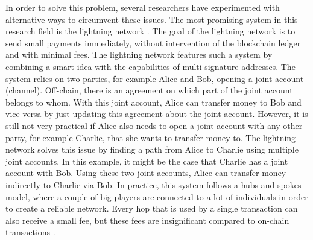 In order to solve this problem, several researchers have experimented with alternative ways to circumvent these issues. The most promising system in this research field is the lightning network \cite{poon2016bitcoin}. The goal of the lightning network is to send small payments immediately, without intervention of the blockchain ledger and with minimal fees. The lightning network features such a system by combining a smart idea with the capabilities of multi signature addresses. The system relies on two parties, for example Alice and Bob, opening a joint account (channel). Off-chain, there is an agreement on which part of the joint account belongs to whom. With this joint account, Alice can transfer money to Bob and vice versa by just updating this agreement about the joint account. However, it is still not very practical if Alice also needs to open a joint account with any other party, for example Charlie, that she wants to transfer money to. The lightning network solves this issue by finding a path from Alice to Charlie using multiple joint accounts. In this example, it might be the case that Charlie has a joint account with Bob. Using these two joint accounts, Alice can transfer money indirectly to Charlie via Bob. In practice, this system follows a hubs and spokes model, where a couple of big players are connected to a lot of individuals in order to create a reliable network. Every hop that is used by a single transaction can also receive a small fee, but these fees are insignificant compared to on-chain transactions \cite{poon2016bitcoin}.

